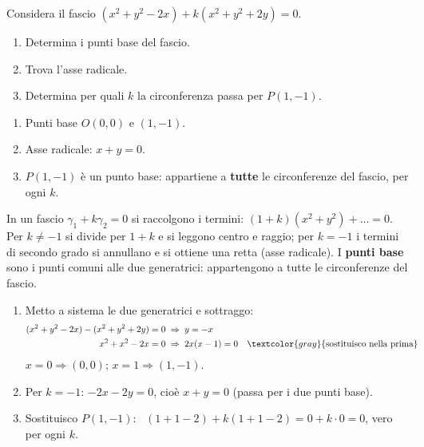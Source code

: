 
\begin{question}[ID=6.3, subtitle={Fascio $(x^2+y^2-2x)+k(x^2+y^2+2y)=0$: punti base e asse radicale}, difficulty=media, tags={fasci, circonferenze}]
Considera il fascio $(x^2+y^2-2x) + k(x^2+y^2+2y)=0$.
\begin{enumerate}
\item Determina i punti base del fascio.
\item Trova l'asse radicale.
\item Determina per quali $k$ la circonferenza passa per $P(1,-1)$.
\end{enumerate}
\begin{solution}
\begin{enumerate}
    \item Punti base $O(0,0)$ e $(1,-1)$.
    \item Asse radicale: $x+y=0$.
    \item $P(1,-1)$ è un punto base: appartiene a \textbf{tutte} le circonferenze del fascio, per ogni $k$.
\end{enumerate}
\end{solution}
\begin{explanation}
In un fascio $\gamma_1+k\gamma_2=0$ si raccolgono i termini: $(1+k)(x^2+y^2)+\dots=0$. Per $k\neq-1$ si divide per $1+k$ e si leggono centro e raggio; per $k=-1$ i termini di secondo grado si annullano e si ottiene una retta (asse radicale). I \textbf{punti base} sono i punti comuni alle due generatrici: appartengono a tutte le circonferenze del fascio.
\begin{enumerate}
    \item Metto a sistema le due generatrici e sottraggo:
    \[\begin{aligned}
    (x^2+y^2-2x)-(x^2+y^2+2y) &= 0 \;\Rightarrow\; y=-x\\
    x^2+x^2-2x &= 0 \;\Rightarrow\; 2x(x-1)=0 && \textcolor{gray}{\text{sostituisco nella prima}}
    \end{aligned}\]
    $x=0 \Rightarrow (0,0)$; \quad $x=1 \Rightarrow (1,-1)$.
    \item Per $k=-1$: $-2x-2y=0$, cioè $x+y=0$ (passa per i due punti base).
    \item Sostituisco $P(1,-1)$: \ $(1+1-2)+k(1+1-2)=0+k\cdot0=0$, vero per ogni $k$.
\end{enumerate}
\end{explanation}
\end{question}

